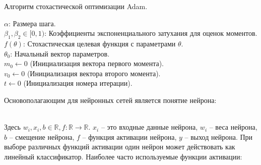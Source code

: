 \begin{algorithm}[H]
\caption{\small Алгоритм стохастической оптимизации Adam.}
$\alpha$: Размера шага. \\
$\beta_1, \beta_2 \in [0,1)$: Коэффициенты экспоненциального затухания для оценок моментов. \\
$f(\theta)$: Стохастическая целевая функция с параметрами $\theta$. \\
$\theta_0$: Начальный вектор параметров. \\
$m_0 \leftarrow 0$ (Инициализация вектора первого момента). \\
$v_0 \leftarrow 0$ (Инициализация вектора второго момента). \\
$t \leftarrow 0$ (Инициализация номера итерации).
\begin{algorithmic}
\ENDWHILE
\end{algorithmic}
\end{algorithm}

Основополагающим для нейронных сетей является понятие нейрона: \\

\

Здесь $w_i, x_i, b \in \mathbb{R}, f: \mathbb{R} \rightarrow \mathbb{R}$. $x_i$ -- это входные данные нейрона, $w_i$ -- веса нейрона, $b$ -- смещение нейрона, $f$ -- функция активации нейрона, $y$ -- выход нейрона. При выборе различных функций активации один нейрон может действовать как линейный классификатор. Наиболее часто используемые функции активации: \\

